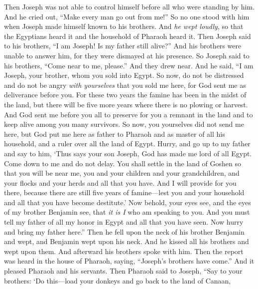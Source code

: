 \begin{biblechapter} %
 Then Joseph was not able to control himself before all who were standing by him. And he cried out, “Make every man go out from me!” So no one stood with him when Joseph made himself known to his brothers.
\verse And \textit{he wept loudly}, so that the Egyptians heard it and the household of Pharaoh heard it.
\verse Then Joseph said to his brothers, “I am Joseph! Is my father still alive?” And his brothers were unable to answer him, for they were dismayed at his presence.
\verse So Joseph said to his brothers, “Come near to me, please.” And they drew near. And he said, “I am Joseph, your brother, whom you sold into Egypt.
\verse So now, do not be distressed and do not be angry \textit{with yourselves} that you sold me here, for God sent me as deliverance before you.
\verse For these two years the famine has been in the midst of the land, but there will be five more years where there is no plowing or harvest.
\verse And God sent me before you all to preserve for you a remnant in the land and to keep alive among you many survivors.
\verse So now, you yourselves did not send me here, but God put me here as father to Pharaoh and as master of all his household, and a ruler over all the land of Egypt.
\verse Hurry, and go up to my father and say to him, ‘Thus says your son Joseph, God has made me lord of all Egypt. Come down to me and do not delay.
\verse You shall settle in the land of Goshen so that you will be near me, you and your children and your grandchildren, and your flocks and your herds and all that you have.
\verse And I will provide for you there, because there are still five years of famine—lest you and your household and all that you have become destitute.’
\verse Now behold, your eyes see, and the eyes of my brother Benjamin see, that \textit{it is I} who am speaking to you.
\verse And you must tell my father of all my honor in Egypt and all that you have seen. Now hurry and bring my father here.”
\verse Then he fell upon the neck of his brother Benjamin and wept, and Benjamin wept upon his neck.
\verse And he kissed all his brothers and wept upon them. And afterward his brothers spoke with him.
\verse Then the report was heard in the house of Pharaoh, saying, “Joseph’s brothers have come.” And it pleased Pharaoh and his servants.
\verse Then Pharaoh said to Joseph, “Say to your brothers: ‘Do this—load your donkeys and go back to the land of Canaan,

\end{biblechapter}
